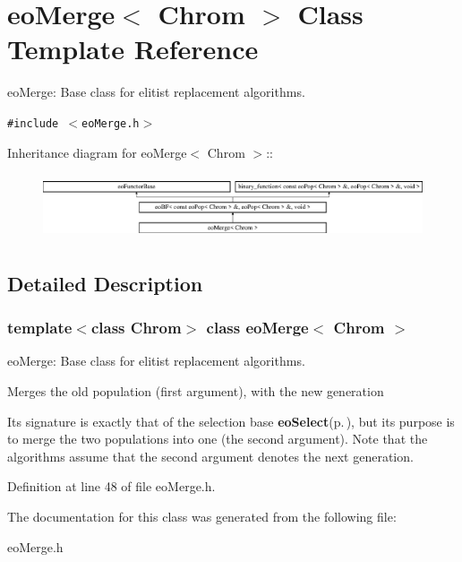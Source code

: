 \section{eo\-Merge$<$ Chrom $>$ Class Template Reference}
\label{classeo_merge}
eo\-Merge: Base class for elitist replacement algorithms.  


{\tt \#include $<$eo\-Merge.h$>$}

Inheritance diagram for eo\-Merge$<$ Chrom $>$::\begin{figure}[H]
\begin{center}
\leavevmode
\includegraphics[height=1.94896cm]{classeo_merge}
\end{center}
\end{figure}


\subsection{Detailed Description}
\subsubsection*{template$<$class Chrom$>$ class eo\-Merge$<$ Chrom $>$}

eo\-Merge: Base class for elitist replacement algorithms. 

Merges the old population (first argument), with the new generation

Its signature is exactly that of the selection base {\bf eo\-Select}{\rm (p.\,\pageref{classeo_select})}, but its purpose is to merge the two populations into one (the second argument). Note that the algorithms assume that the second argument denotes the next generation. 



Definition at line 48 of file eo\-Merge.h.

The documentation for this class was generated from the following file:\begin{CompactItemize}
\item 
eo\-Merge.h\end{CompactItemize}
